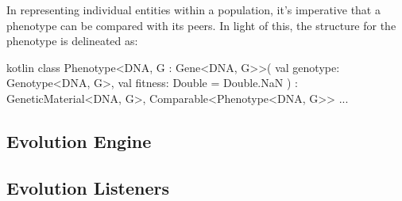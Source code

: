       In representing individual entities within a population, it's imperative 
      that a phenotype can be compared with its peers. 
      In light of this, the structure for the phenotype is delineated as:
      
      \begin{code}{kotlin}
        class Phenotype<DNA, G : Gene<DNA, G>>(
            val genotype: Genotype<DNA, G>,
            val fitness: Double = Double.NaN
        ) : GeneticMaterial<DNA, G>, Comparable<Phenotype<DNA, G>> { ... }
      \end{code}
      
  \subsection{Evolution Engine}
  \label{sec:keen:ga:engine}
    \Blindtext
  \subsection{Evolution Listeners}
  \label{sec:keen:ga:listeners}
    \Blindtext

